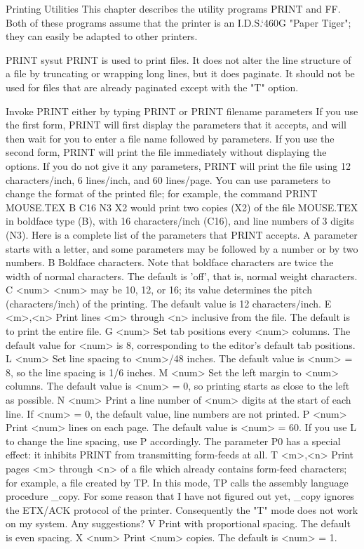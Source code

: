 \ch Printing Utilities
This chapter describes the utility programs PRINT and FF.
Both of these programs assume that the printer is an I.D.S.`460G
"Paper Tiger"; they can easily be adapted to other printers.

\se PRINT
\mr sysut
PRINT is used to print files.
It does not alter the line structure of a file by truncating or wrapping
long lines, but it does paginate.
It should not be used for files that are already paginated except with the
"T" option.

\pa Invoke PRINT either by typing \bd PRINT \ed or
\bd PRINT filename parameters \ed
If you use the first form, PRINT will first display the parameters that
it accepts, and will then wait for you to enter a file name followed
by parameters.
If you use the second form, PRINT will print the file immediately
without displaying the options.
\pa If you do not give it any parameters, PRINT will print the file
using 12 characters/inch, 6 lines/inch, and 60 lines/page.
You can use parameters to change the format of the printed file;
for example, the command
\bd PRINT MOUSE.TEX B C16 N3 X2 \ed
would print two copies (X2) of the file MOUSE.TEX in boldface type (B), with 
16 characters/inch (C16), and line numbers of 3 digits (N3).
Here is a complete list of the parameters that PRINT accepts.
A parameter starts with a letter, and some parameters may be followed by
a number or by two numbers.
 B  Boldface characters.  Note that boldface characters are
twice the width of normal characters.  The default is
'off', that is, normal weight characters.
  C <num>  <num> may be 10, 12, or 16; its value determines 
the pitch (characters/inch) of the printing.  The default value is 
12 characters/inch.
  E <m>,<n>  Print lines <m> through <n> inclusive from the 
file. The default is to print the entire file.
  G <num>  Set tab positions every <num> columns.  The default
value for <num> is 8, corresponding to the editor's default tab positions.
  L <num>  Set line spacing to <num>/48 inches.  The default
value is <num> = 8, so the line spacing is 1/6 inches.
  M <num>  Set the left margin to <num> columns.  The default
value is <num> = 0, so printing starts as close to the left as possible.
  N <num>  Print a line number of <num> digits at the start of
each line.  If <num> = 0, the default value, line numbers are not printed.
  P <num>  Print <num> lines on each page.  The default value
is <num> = 60.  If you use L to change the line spacing, use P accordingly.
The parameter P0 has a special effect: it inhibits PRINT from transmitting 
form-feeds at all.
  T <m>,<n>  Print pages <m> through <n> of a file which
already contains form-feed characters; for example, a file created by 
TP. 
 In this mode, TP calls the assembly language procedure _copy.
For some reason that I have not figured out yet, _copy ignores the
ETX/ACK protocol of the printer.
Consequently the "T" mode does not work on my system.
Any suggestions?
  V  Print with proportional spacing.
The default is even spacing.
  X <num>  Print <num> copies.  The default is <num> = 1.

